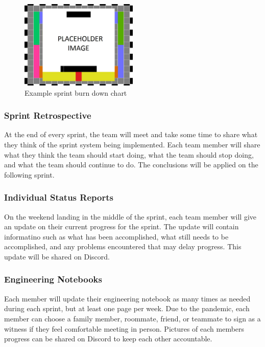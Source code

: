 \begin{figure}[h!]
    \centering
    \includegraphics[width=0.5\textwidth]{images/test_image}
    \caption{Example sprint burn down chart}
\end{figure}

\subsubsection{Sprint Retrospective}

At the end of every sprint, the team will meet and take some time to share what they think of the sprint system being implemented. Each team member will share what they think the team should start doing, what the team should stop doing, and what the team should continue to do. The conclusions will be applied on the following sprint.

\subsubsection{Individual Status Reports}

On the weekend landing in the middle of the sprint, each team member will give an update on their current progress for the sprint. The update will contain informatino such as what has been accomplished, what still needs to be accomplished, and any problems encountered that may delay progress. This update will be shared on Discord.

\subsubsection{Engineering Notebooks}

Each member will update their engineering notebook as many times as needed during each sprint, but at least one page per week. Due to the pandemic, each member can choose a family member, roommate, friend, or teammate to sign as a witness if they feel comfortable meeting in person. Pictures of each members progress can be shared on Discord to keep each other accountable.

